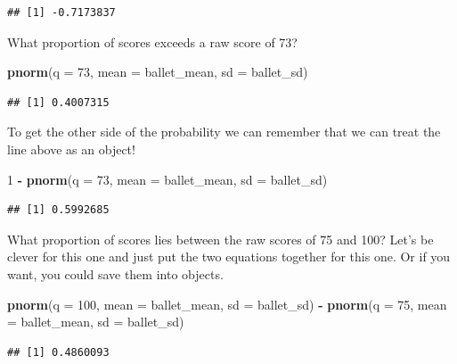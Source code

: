 \documentclass[]{book}
\newenvironment{Shaded}{\begin{snugshade}}{\end{snugshade}}
\newcommand{\KeywordTok}[1]{\textcolor[rgb]{0.13,0.29,0.53}{\textbf{#1}}}
\newcommand{\DataTypeTok}[1]{\textcolor[rgb]{0.13,0.29,0.53}{#1}}
\newcommand{\DecValTok}[1]{\textcolor[rgb]{0.00,0.00,0.81}{#1}}
\newcommand{\StringTok}[1]{\textcolor[rgb]{0.31,0.60,0.02}{#1}}
\newcommand{\OperatorTok}[1]{\textcolor[rgb]{0.81,0.36,0.00}{\textbf{#1}}}
\newcommand{\NormalTok}[1]{#1}
\theoremstyle{definition}
\theoremstyle{definition}
\theoremstyle{definition}
\theoremstyle{remark}
\begin{document}
\begin{verbatim}
## [1] -0.7173837
\end{verbatim}

What proportion of scores exceeds a raw score of 73?

\begin{Shaded}
\begin{Highlighting}[]
\KeywordTok{pnorm}\NormalTok{(}\DataTypeTok{q =} \DecValTok{73}\NormalTok{, }\DataTypeTok{mean =}\NormalTok{ ballet_mean, }\DataTypeTok{sd =}\NormalTok{  ballet_sd)}
\end{Highlighting}
\end{Shaded}

\begin{verbatim}
## [1] 0.4007315
\end{verbatim}

To get the other side of the probability we can remember that we can
treat the line above as an object!

\begin{Shaded}
\begin{Highlighting}[]
\DecValTok{1} \OperatorTok{-}\StringTok{ }\KeywordTok{pnorm}\NormalTok{(}\DataTypeTok{q =} \DecValTok{73}\NormalTok{, }\DataTypeTok{mean =}\NormalTok{ ballet_mean, }\DataTypeTok{sd =}\NormalTok{  ballet_sd)}
\end{Highlighting}
\end{Shaded}

\begin{verbatim}
## [1] 0.5992685
\end{verbatim}

What proportion of scores lies between the raw scores of 75 and 100?
Let's be clever for this one and just put the two equations together for
this one. Or if you want, you could save them into objects.

\begin{Shaded}
\begin{Highlighting}[]
\KeywordTok{pnorm}\NormalTok{(}\DataTypeTok{q =} \DecValTok{100}\NormalTok{, }\DataTypeTok{mean =}\NormalTok{ ballet_mean, }\DataTypeTok{sd =}\NormalTok{  ballet_sd) }\OperatorTok{-}\StringTok{ }\KeywordTok{pnorm}\NormalTok{(}\DataTypeTok{q =} \DecValTok{75}\NormalTok{, }\DataTypeTok{mean =}\NormalTok{ ballet_mean, }\DataTypeTok{sd =}\NormalTok{  ballet_sd)}
\end{Highlighting}
\end{Shaded}

\begin{verbatim}
## [1] 0.4860093
\end{verbatim}
\end{document}
